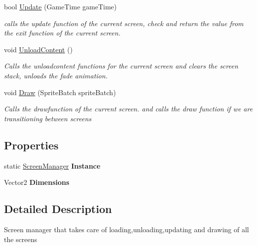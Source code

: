 \begin{DoxyCompactItemize}
bool \hyperlink{class_pacman_1_1_screen_manager_a1ec7dc1ef0d31e3d8db362644ae0351b}{Update} (Game\-Time game\-Time)
\begin{DoxyCompactList}\small\item\em calls the update function of the current screen, check and return the value from the exit function of the current screen. \end{DoxyCompactList}\item 
void \hyperlink{class_pacman_1_1_screen_manager_ae9477d036da420ac6754c75603f38d08}{Unload\-Content} ()
\begin{DoxyCompactList}\small\item\em Calls the unloadcontent functions for the current screen and clears the screen stack, unloads the fade animation. \end{DoxyCompactList}\item 
void \hyperlink{class_pacman_1_1_screen_manager_ae5011a30dc8765de4dd061cba48c7f89}{Draw} (Sprite\-Batch sprite\-Batch)
\begin{DoxyCompactList}\small\item\em Calls the drawfunction of the current screen. and calls the draw function if we are transitioning between screens \end{DoxyCompactList}\end{DoxyCompactItemize}
\subsection*{Properties}
\begin{DoxyCompactItemize}
\item 
\hypertarget{class_pacman_1_1_screen_manager_a6632eccad8f05e37af385c0c2b230250}{static \hyperlink{class_pacman_1_1_screen_manager}{Screen\-Manager} {\bfseries Instance}}\label{class_pacman_1_1_screen_manager_a6632eccad8f05e37af385c0c2b230250}

\item 
\hypertarget{class_pacman_1_1_screen_manager_aa830efd676bbf0af192ac4a0c70b9dfb}{Vector2 {\bfseries Dimensions}}\label{class_pacman_1_1_screen_manager_aa830efd676bbf0af192ac4a0c70b9dfb}

\end{DoxyCompactItemize}


\subsection{Detailed Description}
Screen manager that takes care of loading,unloading,updating and drawing of all the screens 



